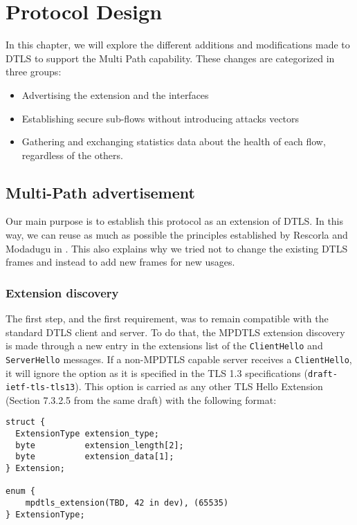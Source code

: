 \chapter{Protocol Design}

In this chapter, we will explore the different additions and modifications made to DTLS to support the Multi Path capability. These changes are categorized in three groups:
\begin{itemize}
\item Advertising the extension and the interfaces
\item Establishing secure sub-flows without introducing attacks vectors
\item Gathering and exchanging statistics data about the health of each flow, regardless of the others. 
\end{itemize}


\section{Multi-Path advertisement}

Our main purpose is to establish this protocol as an extension of DTLS. In this way, we can reuse as much as possible the principles established by Rescorla and Modadugu in \cite{modadugu2004design}. This also explains why we tried not to change the existing DTLS frames and instead to add new frames for new usages.

\subsection{Extension discovery}

The first step, and the first requirement, was to remain compatible with the standard DTLS client and server. To do that, the MPDTLS extension discovery is made through a new entry in the extensions list of the \verb!ClientHello! and \verb!ServerHello! messages. If a non-MPDTLS capable server receives a \verb!ClientHello!, it will ignore the option  as it is specified in the TLS 1.3 specifications (\verb!draft-ietf-tls-tls13!\cite{draft-tls13}). This option is carried as any other TLS Hello Extension (Section 7.3.2.5 from the same draft) with the following format:

\begin{lstlisting}[caption=MultiPath DTLS Extension structure, label=lst:extension]
struct {
  ExtensionType extension_type;
  byte          extension_length[2];
  byte          extension_data[1];
} Extension;

enum {
    mpdtls_extension(TBD, 42 in dev), (65535)
} ExtensionType;
\end{lstlisting}


